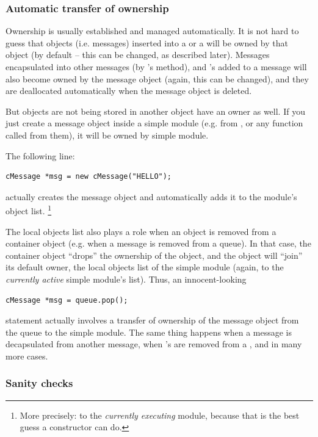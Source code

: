 \subsubsection{Automatic transfer of ownership}

Ownership is usually established and managed automatically.
It is not hard to guess that objects (i.e. messages) inserted
into a  or a  will be owned by that object
(by default -- this can be changed, as described later).
Messages encapsulated into other messages (by 's
 method), and 's added to a message
will also become owned by the message object (again, this can be
changed), and they are deallocated automatically when the
message object is deleted.

But objects are not being stored in another object have an owner
as well. If you just create a message object inside a simple module
(e.g. from , 
or any function called from them), it will be owned by simple module.

The following line:

\begin{verbatim}
cMessage *msg = new cMessage("HELLO");
\end{verbatim}

actually creates the message object and automatically adds it
to the module's object list.
  \footnote{More precisely: to the \textit{currently executing} module,
  because that is the best guess a  constructor can do.}

The local objects list also plays a role when an object is
removed from a container object (e.g. when a message is removed
from a queue).
In that case, the container object ``drops'' the ownership of the
object, and the object will ``join'' its default owner,
the local objects list of the simple module (again, to the
\textit{currently active} simple module's list).
Thus, an innocent-looking

\begin{verbatim}
cMessage *msg = queue.pop();
\end{verbatim}

statement actually involves a transfer of ownership of the message
object from the queue to the simple module.
The same thing happens when a message is decapsulated from another message,
when 's are removed from a , and in many more cases.


\subsubsection{Sanity checks}


